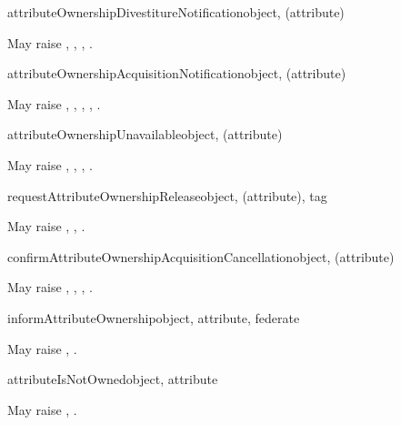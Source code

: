 \begin{methoddesc}{attributeOwnershipDivestitureNotification}{object, (attribute)}

May raise
,
,
,
.
\end{methoddesc}

\begin{methoddesc}{attributeOwnershipAcquisitionNotification}{object, (attribute)}

May raise
,
,
,
,
.
\end{methoddesc}

\begin{methoddesc}{attributeOwnershipUnavailable}{object, (attribute)}

May raise
,
,
,
.
\end{methoddesc}

\begin{methoddesc}{requestAttributeOwnershipRelease}{object, (attribute), tag}

May raise
,
,
.
\end{methoddesc}

\begin{methoddesc}{confirmAttributeOwnershipAcquisitionCancellation}{object, (attribute)}

May raise
,
,
,
.
\end{methoddesc}

\begin{methoddesc}{informAttributeOwnership}{object, attribute, federate}

May raise
,
.
\end{methoddesc}

\begin{methoddesc}{attributeIsNotOwned}{object, attribute}

May raise
,
.
\end{methoddesc}

